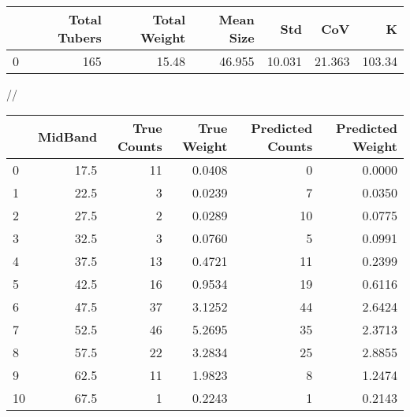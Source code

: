 \begin{tabular}{lrrrrrr}
\toprule
{} &  Total Tubers &  Total Weight &  Mean Size &     Std &     CoV &       K \\
\midrule
0 &           165 &         15.48 &     46.955 &  10.031 &  21.363 &  103.34 \\
\bottomrule
\end{tabular}
//\begin{tabular}{lrrrrr}
\toprule
{} &  MidBand &  True Counts &  True Weight &  Predicted Counts &  Predicted Weight \\
\midrule
0  &     17.5 &           11 &       0.0408 &                 0 &            0.0000 \\
1  &     22.5 &            3 &       0.0239 &                 7 &            0.0350 \\
2  &     27.5 &            2 &       0.0289 &                10 &            0.0775 \\
3  &     32.5 &            3 &       0.0760 &                 5 &            0.0991 \\
4  &     37.5 &           13 &       0.4721 &                11 &            0.2399 \\
5  &     42.5 &           16 &       0.9534 &                19 &            0.6116 \\
6  &     47.5 &           37 &       3.1252 &                44 &            2.6424 \\
7  &     52.5 &           46 &       5.2695 &                35 &            2.3713 \\
8  &     57.5 &           22 &       3.2834 &                25 &            2.8855 \\
9  &     62.5 &           11 &       1.9823 &                 8 &            1.2474 \\
10 &     67.5 &            1 &       0.2243 &                 1 &            0.2143 \\
\bottomrule
\end{tabular}
